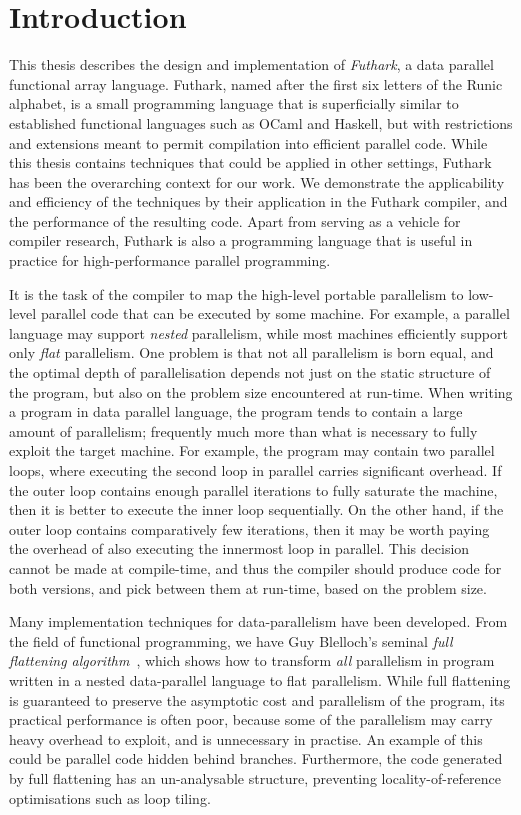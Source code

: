 \chapter{Introduction}

This thesis describes the design and implementation of
\textit{Futhark}, a data parallel functional array language.  Futhark,
named after the first six letters of the Runic alphabet, is a small
programming language that is superficially similar to established
functional languages such as OCaml and Haskell, but with restrictions
and extensions meant to permit compilation into efficient parallel
code.  While this thesis contains techniques that could be applied in
other settings, Futhark has been the overarching context for our work.
We demonstrate the applicability and efficiency of the techniques by
their application in the Futhark compiler, and the performance of the
resulting code.  Apart from serving as a vehicle for compiler
research, Futhark is also a programming language that is useful in
practice for high-performance parallel programming.

It is the task of the compiler to map the high-level portable
parallelism to low-level parallel code that can be executed by some
machine.  For example, a parallel language may support \textit{nested}
parallelism, while most machines efficiently support only
\textit{flat} parallelism.  One problem is that not all parallelism is
born equal, and the optimal depth of parallelisation depends not just
on the static structure of the program, but also on the problem size
encountered at run-time.  When writing a program in data parallel
language, the program tends to contain a large amount of parallelism;
frequently much more than what is necessary to fully exploit the
target machine.  For example, the program may contain two parallel
loops, where executing the second loop in parallel carries significant
overhead.  If the outer loop contains enough parallel iterations to
fully saturate the machine, then it is better to execute the inner
loop sequentially.  On the other hand, if the outer loop contains
comparatively few iterations, then it may be worth paying the overhead
of also executing the innermost loop in parallel.  This decision
cannot be made at compile-time, and thus the compiler should produce
code for both versions, and pick between them at run-time, based on
the problem size.

Many implementation techniques for data-parallelism have been
developed.  From the field of functional programming, we have Guy
Blelloch's seminal \textit{full flattening
  algorithm}~\cite{blelloch1994implementation}, which shows how to
transform \textit{all} parallelism in program written in a nested
data-parallel language to flat parallelism.  While full flattening is
guaranteed to preserve the asymptotic cost and parallelism of the
program, its practical performance is often poor, because some of the
parallelism may carry heavy overhead to exploit, and is unnecessary in
practise.  An example of this could be parallel code hidden behind
branches.  Furthermore, the code generated by full flattening has an
un-analysable structure, preventing locality-of-reference
optimisations such as loop tiling.


